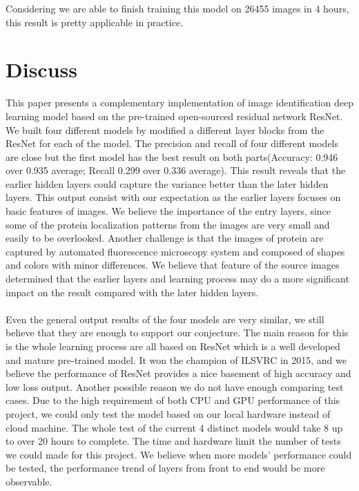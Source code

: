 \documentclass{article}
\begin{document}
Considering we are able to finish training this model on 26455 images in 4 hours, this result is pretty applicable in practice.

\section{Discuss}
This paper presents a complementary implementation of image identification deep learning model based on the pre-trained open-sourced residual network ResNet. We built four different models by modified a different layer blocks from the ResNet for each of the model. The precision and recall of four different models are close but the first model has the best result on both parts(Accuracy: 0.946 over 0.935 average; Recall 0.299 over 0.336 average). This result reveals that the earlier hidden layers could capture the variance better than the later hidden layers. This output consist with our expectation as the earlier layers focuses on basic features of images. We believe the importance of the entry layers, since some of the protein localization patterns from the images are very small and easily to be overlooked. Another challenge is that the images of protein are captured by automated fluorescence microscopy system and composed of shapes and colors with minor differences. We believe that feature of the source images determined that the earlier layers and learning process may do a more significant impact on the result compared with the later hidden layers.
\\
\\
Even the general output results of the four models are very similar, we still believe that they are enough to support our conjecture. The main reason for this is the whole learning process are all based on ResNet which is a well developed and mature pre-trained model. It won the champion of ILSVRC in 2015, and we believe the performance of ResNet provides a nice basement of high accuracy and low loss output. Another possible reason we do not have enough comparing test cases.
Due to the high requirement of both CPU and GPU performance of this project, we could only test the model based on our local hardware instead of cloud machine. The whole test of the current 4 distinct models would take 8 up to over 20 hours to complete. The time and hardware limit the number of tests we could made for this project. We believe when more models' performance could be tested, the performance trend of layers from front to end would be more observable.
\\
\\
\end{document}
